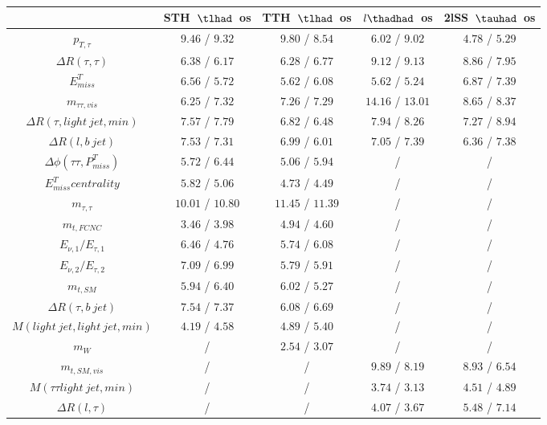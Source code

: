\begin{table}
\caption{}
\centering
\begin{tabular}{|c|c|c|c|c|} \hline
 & STH~$\tlhad$~os & TTH~$\tlhad$~os & $l\thadhad$~os & 2lSS~$\tauhad$~os\\\hline
$p_{T,\tau }$ & $9.46$ / $9.32$ & $9.80$ / $8.54$ & $6.02$ / $9.02$ & $4.78$ / $5.29$\\\hline
$\Delta R(\tau ,\tau )$ & $6.38$ / $6.17$ & $6.28$ / $6.77$ & $9.12$ / $9.13$ & $8.86$ / $7.95$\\\hline
$E^{T}_{miss}$ & $6.56$ / $5.72$ & $5.62$ / $6.08$ & $5.62$ / $5.24$ & $6.87$ / $7.39$\\\hline
$m_{\tau \tau ,vis}$ & $6.25$ / $7.32$ & $7.26$ / $7.29$ & $14.16$ / $13.01$ & $8.65$ / $8.37$\\\hline
$\Delta R(\tau ,light~jet,min)$ & $7.57$ / $7.79$ & $6.82$ / $6.48$ & $7.94$ / $8.26$ & $7.27$ / $8.94$\\\hline
$\Delta R(l,b~jet)$ & $7.53$ / $7.31$ & $6.99$ / $6.01$ & $7.05$ / $7.39$ & $6.36$ / $7.38$\\\hline
$\Delta\phi(\tau \tau ,P^{T}_{miss})$ & $5.72$ / $6.44$ & $5.06$ / $5.94$ &  / &  /\\\hline
$E^{T}_{miss} centrality$ & $5.82$ / $5.06$ & $4.73$ / $4.49$ &  / &  /\\\hline
$m_{\tau ,\tau }$ & $10.01$ / $10.80$ & $11.45$ / $11.39$ &  / &  /\\\hline
$m_{t,FCNC}$ & $3.46$ / $3.98$ & $4.94$ / $4.60$ &  / &  /\\\hline
$E_{\nu,1}/E_{\tau ,1}$ & $6.46$ / $4.76$ & $5.74$ / $6.08$ &  / &  /\\\hline
$E_{\nu,2}/E_{\tau ,2}$ & $7.09$ / $6.99$ & $5.79$ / $5.91$ &  / &  /\\\hline
$m_{t,SM}$ & $5.94$ / $6.40$ & $6.02$ / $5.27$ &  / &  /\\\hline
$\Delta R(\tau ,b~jet)$ & $7.54$ / $7.37$ & $6.08$ / $6.69$ &  / &  /\\\hline
$M(light~jet,light~jet,min)$ & $4.19$ / $4.58$ & $4.89$ / $5.40$ &  / &  /\\\hline
$m_{W}$ &  / & $2.54$ / $3.07$ &  / &  /\\\hline
$m_{t,SM,vis}$ &  / &  / & $9.89$ / $8.19$ & $8.93$ / $6.54$\\\hline
$M(\tau \tau light~jet,min)$ &  / &  / & $3.74$ / $3.13$ & $4.51$ / $4.89$\\\hline
$\Delta R(l,\tau )$ &  / &  / & $4.07$ / $3.67$ & $5.48$ / $7.14$\\\hline

\end{tabular}
\end{table}
